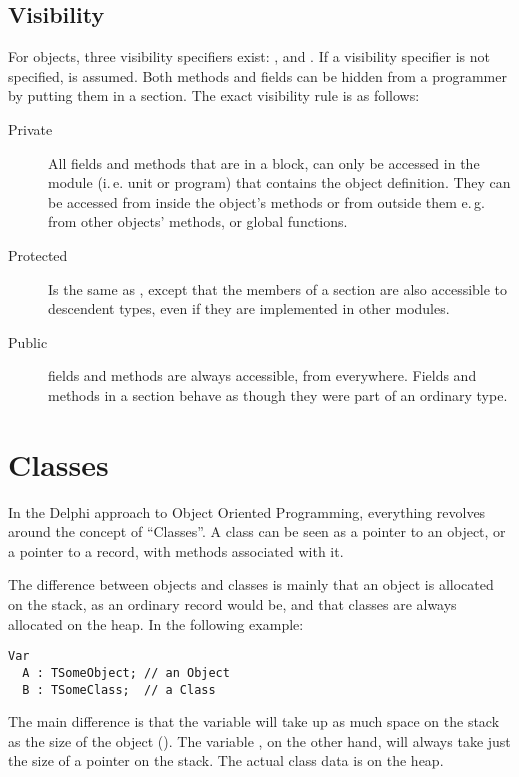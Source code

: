 \section{Visibility}
For objects, three visibility specifiers exist: ,  and
. If a visibility specifier is not specified, 
is assumed.
Both methods and fields can be hidden from a programmer by putting them
in a  section. The exact visibility rule is as follows:
\begin{description}
\item [Private\ ] All fields and methods that are in a  block,
can  only be accessed in the module (i.\,e. unit or program) that contains
the object definition.
They can be accessed from inside the object's methods or from outside them
e.\,g. from other objects' methods, or global functions.
\item [Protected\ ] Is the same as , except that the members of
a  section are also accessible to descendent types, even if
they are implemented in other modules.
\item [Public\ ] fields and methods are always accessible, from everywhere.
Fields and methods in a  section behave as though they were part
of an ordinary  type.
\end{description}

\chapter{Classes}
\label{ch:Classes}
In the Delphi approach to Object Oriented Programming, everything revolves
around  the concept of ``Classes''.  A class can be seen as a pointer to an
object, or a pointer to a record, with methods associated with it.

The difference between objects and classes is mainly that an object
is allocated on the stack, as an ordinary record would be, and that
classes are always allocated on the heap. In the following example:
\begin{verbatim}
Var
  A : TSomeObject; // an Object
  B : TSomeClass;  // a Class
\end{verbatim}
The main difference is that the variable  will take up as much
space on the stack as the size of the object (). The
variable , on the other hand, will always take just the size of
a pointer on the stack. The actual class data is on the heap.

